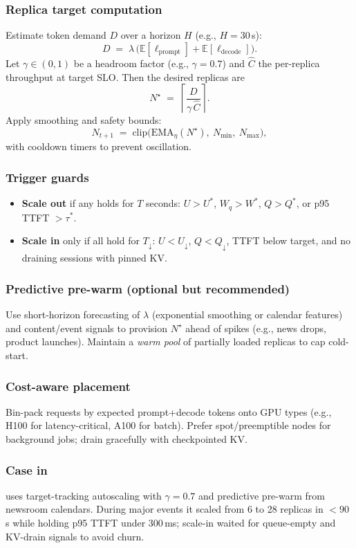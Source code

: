 \subsubsection{Replica target computation}
Estimate token demand $D$ over a horizon $H$ (e.g., $H=30$\,s):
\[
D \;=\; \lambda\, \big(\mathbb{E}[\ell_{\text{prompt}}]+\mathbb{E}[\ell_{\text{decode}}]\big).
\]
Let $\gamma\in(0,1)$ be a headroom factor (e.g., $\gamma=0.7$) and $\hat{C}$ the per-replica throughput at target SLO.
Then the desired replicas are
\[
N^\star \;=\; \left\lceil \frac{D}{\gamma\, \hat{C}} \right\rceil .
\]
Apply smoothing and safety bounds:
\[
N_{t+1} \;=\; \mathrm{clip}\!\Big(\mathrm{EMA}_\eta(N^\star),\ N_{\min},\ N_{\max}\Big),
\]
with cooldown timers to prevent oscillation.

\subsubsection{Trigger guards}
\begin{itemize}
  \item \textbf{Scale out} if any holds for $T$ seconds: $U>\!U^{*}$, $W_q>\!W^{*}$, $Q>\!Q^{*}$, or p95 TTFT $>\!\tau^{*}$.
  \item \textbf{Scale in} only if all hold for $T_{\downarrow}$: $U< U_{\downarrow}$, $Q<Q_{\downarrow}$, TTFT below target, and no draining sessions with pinned KV.
\end{itemize}

\subsubsection{Predictive pre-warm (optional but recommended)}
Use short-horizon forecasting of $\lambda$ (exponential smoothing or calendar features) and content/event signals to provision $N^\star$ ahead of spikes (e.g., news drops, product launches). Maintain a \emph{warm pool} of partially loaded replicas to cap cold-start.

\subsubsection{Cost-aware placement}
Bin-pack requests by expected prompt+decode tokens onto GPU types (e.g., H100 for latency-critical, A100 for batch). Prefer spot/preemptible nodes for background jobs; drain gracefully with checkpointed KV.

\subsubsection{Case in \ishtar{}}
\ishtar{} uses target-tracking autoscaling with $\gamma=0.7$ and predictive pre-warm from newsroom calendars. During major events it scaled from 6 to 28 replicas in $<\!90$\,s while holding p95 TTFT under 300\,ms; scale-in waited for queue-empty and KV-drain signals to avoid churn.

